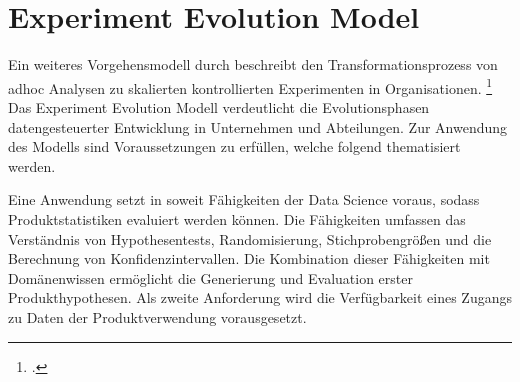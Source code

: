 \section{Experiment Evolution Model}

Ein weiteres Vorgehensmodell durch  beschreibt den Transformationsprozess von adhoc Analysen zu skalierten kontrollierten Experimenten in Organisationen. \footcite[Vgl.][S. 5]{Fabijan.2017}
Das Experiment Evolution Modell verdeutlicht die Evolutionsphasen datengesteuerter Entwicklung in Unternehmen und Abteilungen.
Zur Anwendung des Modells sind Voraussetzungen zu erfüllen, welche folgend thematisiert werden.

Eine Anwendung setzt in soweit Fähigkeiten der Data Science voraus, sodass Produktstatistiken evaluiert werden können.
Die Fähigkeiten umfassen das Verständnis von Hypothesentests, Randomisierung, Stichprobengrößen und die Berechnung von Konfidenzintervallen. %
Die Kombination dieser Fähigkeiten mit Domänenwissen ermöglicht die Generierung und Evaluation erster Produkthypothesen.
Als zweite Anforderung wird die Verfügbarkeit eines Zugangs zu Daten der Produktverwendung vorausgesetzt.

